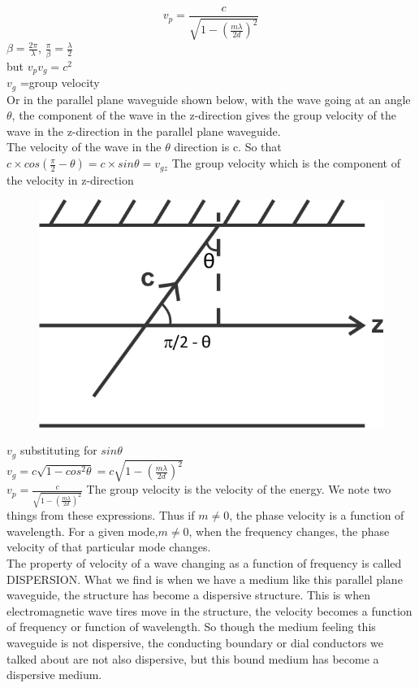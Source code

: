 \begin{equation*}
v_{p} =\frac{c}{\sqrt{1-(\frac{m\lambda}{2d})^{2}}}
\end{equation*}
$\beta =\frac{2\pi}{\lambda}$, $\frac{\pi}{\beta} =\frac{\lambda}{2}$\\
but $v_{p} v_{g}= c^{2}$\\
$v_{g}$ =group velocity\\
Or in the parallel plane waveguide shown below, with the wave going at an angle $\theta$, the component of the wave in the z-direction gives the group velocity of the wave in the z-direction in the parallel plane waveguide.\\
The velocity of the wave in the $\theta$ direction is c. So that $c\times cos(\frac{\pi}{2} - \theta)= c\times sin\theta= v_{gz}$
The group velocity which is the component of the velocity in z-direction\\
\begin{figure}[h]
\centering
\includegraphics[scale=1]{./graphics/silas4}
\caption{}
\end{figure}
$v_{g}$ substituting for $sin\theta$\\
$v_{g} =c\sqrt{1-cos^{2}\theta} =c\sqrt{1-(\frac{m\lambda}{2d})^{2}}$\\ 
$v_{p}= \frac{c}{\sqrt{1-(\frac{m\lambda}{2d})^{2}}}$
The group velocity is the velocity of the energy. We note two things from these expressions.
Thus if $m \neq 0$, the phase velocity is a function of wavelength. For a given mode,$m \neq 0$, when the frequency changes, the phase velocity of that particular mode changes.\\
The property of velocity of a wave changing as a function of frequency is called DISPERSION. What we find is when we have a medium like this parallel plane waveguide, the structure has become a dispersive structure. This is when electromagnetic wave tires move in the structure, the velocity becomes a function of frequency or function of wavelength. So though the medium feeling this waveguide is not dispersive, the conducting boundary or dial conductors we talked about are not also dispersive, but this bound medium has become a dispersive medium.\\ 
